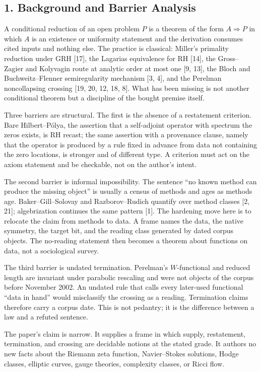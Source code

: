 \documentclass[10pt,twocolumn]{article}
\begin{document}
\subsection{1. Background and Barrier
Analysis}\label{background-and-barrier-analysis}

A conditional reduction of an open problem \(P\) is a theorem of the
form \(A \Rightarrow P\) in which \(A\) is an existence or uniformity
statement and the derivation consumes cited inputs and nothing else. The
practice is classical: Miller's primality reduction under GRH {[}17{]},
the Lagarias equivalence for RH {[}14{]}, the Gross--Zagier and
Kolyvagin route at analytic order at most one {[}9, 13{]}, the Bloch and
Buchweitz--Flenner semiregularity mechanism {[}3, 4{]}, and the Perelman
noncollapsing crossing {[}19, 20, 12, 18, 8{]}. What has been missing is
not another conditional theorem but a discipline of the bought premise
itself.

Three barriers are structural. The first is the absence of a restatement
criterion. Bare Hilbert--Pólya, the assertion that a self-adjoint
operator with spectrum the zeros exists, is RH recast; the same
assertion with a provenance clause, namely that the operator is produced
by a rule fixed in advance from data not containing the zero locations,
is stronger and of different type. A criterion must act on the axiom
statement and be checkable, not on the author's intent.

The second barrier is informal impossibility. The sentence ``no known
method can produce the missing object'' is usually a census of methods
and ages as methods age. Baker--Gill--Solovay and Razborov--Rudich
quantify over method classes {[}2, 21{]}; algebrization continues the
same pattern {[}1{]}. The hardening move here is to relocate the claim
from methods to data. A frame names the data, the native symmetry, the
target bit, and the reading class generated by dated corpus objects. The
no-reading statement then becomes a theorem about functions on data, not
a sociological survey.

The third barrier is undated termination. Perelman's \(W\)-functional
and reduced length are invariant under parabolic rescaling and were not
objects of the corpus before November 2002. An undated rule that calls
every later-used functional ``data in hand'' would misclassify the
crossing as a reading. Termination claims therefore carry a corpus date.
This is not pedantry; it is the difference between a law and a refuted
sentence.

The paper's claim is narrow. It supplies a frame in which supply,
restatement, termination, and crossing are decidable notions at the
stated grade. It authors no new facts about the Riemann zeta function,
Navier--Stokes solutions, Hodge classes, elliptic curves, gauge
theories, complexity classes, or Ricci flow.
\end{document}
